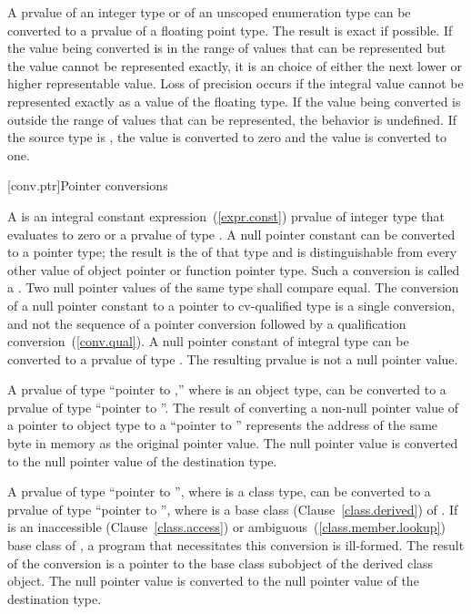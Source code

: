 \pnum
{}%
%
%
A prvalue of an integer type or of an unscoped enumeration type can be converted to
a prvalue of a floating point type. The result is exact if possible. If the value being
converted is in the range of values that can be represented but the value cannot be
represented exactly, it is an  choice of either the next lower or higher representable
value. \enternote Loss of precision occurs if the integral value cannot be represented
exactly as a value of the floating type. \exitnote If the value being converted is
outside the range of values that can be represented, the behavior is undefined. If the
source type is , the value  is converted to zero and the value
 is converted to one.

[conv.ptr]{Pointer conversions}

\pnum
{}%
%
%
%
A  is an integral constant
expression~(\ref{expr.const}) prvalue of integer type that evaluates to zero
or a prvalue of type . A null pointer constant can be
converted to a pointer type; the
result is the  of that type and is
distinguishable from every other value of
object pointer or function pointer
type.
Such a conversion is called a .
Two null pointer values of the same type shall compare
equal. The conversion of a null pointer constant to a pointer to
cv-qualified type is a single conversion, and not the sequence of a
pointer conversion followed by a qualification
conversion~(\ref{conv.qual}). A null pointer constant of integral type
can be converted to a prvalue of type .
\enternote The resulting prvalue is not a null pointer value. \exitnote

\pnum
A prvalue of type ``pointer to  ,'' where 
is an object type, can be converted to a prvalue of type ``pointer to
 ''. The result of converting a 
non-null pointer value of a pointer to object type to a ``pointer to
 ''
represents the address of the same byte in memory as the original pointer
value. The null pointer value is converted to the null pointer
value of the destination type.

\pnum
A prvalue of type ``pointer to  '', where 
is a class type, can be converted to a prvalue of type ``pointer to
 '', where  is a base class
(Clause~\ref{class.derived}) of . If  is an
inaccessible (Clause~\ref{class.access}) or
ambiguous~(\ref{class.member.lookup}) base class of , a program
that necessitates this conversion is ill-formed. The result of the
conversion is a pointer to the base class subobject of the derived class
object. The null pointer value is converted to the null pointer value of
the destination type.

